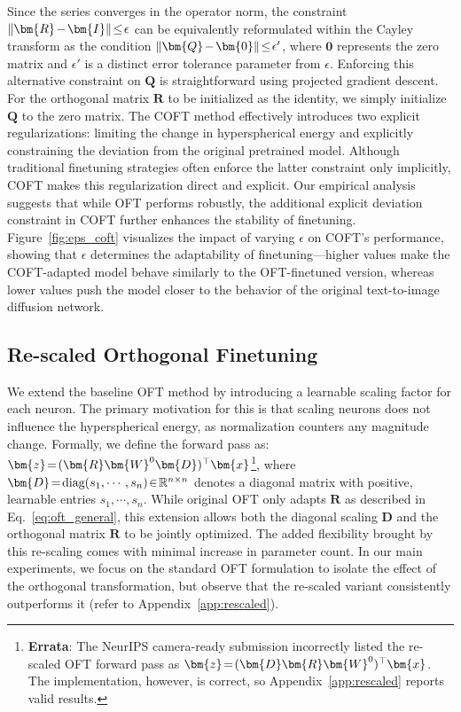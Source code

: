 Since the series converges in the operator norm, the constraint $\thickmuskip=2mu \medmuskip=2mu\|\bm{R}-\bm{I}\|\leq\epsilon$ can be equivalently reformulated within the Cayley transform as the condition $\thickmuskip=2mu \medmuskip=2mu \|\bm{Q}-\bm{0}\|\leq\epsilon'$, where $\bm{0}$ represents the zero matrix and $\epsilon'$ is a distinct error tolerance parameter from $\epsilon$. Enforcing this alternative constraint on $\bm{Q}$ is straightforward using projected gradient descent. For the orthogonal matrix $\bm{R}$ to be initialized as the identity, we simply initialize $\bm{Q}$ to the zero matrix. The COFT method effectively introduces two explicit regularizations: limiting the change in hyperspherical energy and explicitly constraining the deviation from the original pretrained model. Although traditional finetuning strategies often enforce the latter constraint only implicitly, COFT makes this regularization direct and explicit. Our empirical analysis suggests that while OFT performs robustly, the additional explicit deviation constraint in COFT further enhances the stability of finetuning. Figure~\ref{fig:eps_coft} visualizes the impact of varying $\epsilon$ on COFT's performance, showing that $\epsilon$ determines the adaptability of finetuning—higher values make the COFT-adapted model behave similarly to the OFT-finetuned version, whereas lower values push the model closer to the behavior of the original text-to-image diffusion network.

\subsection{Re-scaled Orthogonal Finetuning}

We extend the baseline OFT method by introducing a learnable scaling factor for each neuron. The primary motivation for this is that scaling neurons does not influence the hyperspherical energy, as normalization counters any magnitude change. Formally, we define the forward pass as: $\thickmuskip=2mu \medmuskip=2mu\bm{z}=(\bm{R}\bm{W}^0\bm{D})^\top\bm{x}$\footnote{\textbf{Errata}: The NeurIPS camera-ready submission incorrectly listed the re-scaled OFT forward pass as $\thickmuskip=2mu \medmuskip=2mu\bm{z}=(\bm{D}\bm{R}\bm{W}^0)^\top\bm{x}$. The implementation, however, is correct, so Appendix~\ref{app:rescaled} reports valid results.}, where $\thickmuskip=2mu \medmuskip=2mu \bm{D}=\text{diag}(s_1,\cdots,s_n)\in\mathbb{R}^{n\times n}$ denotes a diagonal matrix with positive, learnable entries $s_1,\cdots,s_n$. While original OFT only adapts $\bm{R}$ as described in Eq.~\eqref{eq:oft_general}, this extension allows both the diagonal scaling $\bm{D}$ and the orthogonal matrix $\bm{R}$ to be jointly optimized. The added flexibility brought by this re-scaling comes with minimal increase in parameter count. In our main experiments, we focus on the standard OFT formulation to isolate the effect of the orthogonal transformation, but observe that the re-scaled variant consistently outperforms it (refer to Appendix~\ref{app:rescaled}).

